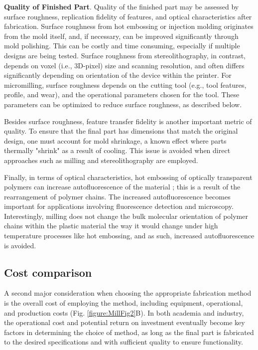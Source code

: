 \textbf{Quality of Finished Part}. Quality of the finished part may be assessed by surface roughness, replication fidelity of features, and optical characteristics after fabrication. Surface roughness from hot embossing or injection molding originates from the mold itself, and, if necessary, can be improved significantly through mold polishing. This can be costly and time consuming, especially if multiple designs are being tested. Surface roughness from stereolithography, in contrast, depends on voxel (i.e., 3D-pixel) size and scanning resolution, and often differs significantly depending on orientation of the device within the printer. For micromilling, surface roughness depends on the cutting tool (e.g., tool features, profile, and wear), and the operational parameters chosen for the tool. These parameters can be optimized to reduce surface roughness, as described below.

Besides surface roughness, feature transfer fidelity is another important metric of quality. To ensure that the final part has dimensions that match the original design, one must account for mold shrinkage, a known effect where parts thermally "shrink" as a result of cooling. This issue is avoided when direct approaches such as milling and stereolithography are employed.

Finally, in terms of optical characteristics, hot embossing of optically transparent polymers can increase autofluorescence of the material \cite{Young2012}; this is a result of the rearrangement of polymer chains. The increased autofluorescence becomes important for applications involving fluorescence detection and microscopy. Interestingly, milling does not change the bulk molecular orientation of polymer chains within the plastic material the way it would change under high temperature processes like hot embossing, and as such, increased autofluorescence is avoided.

\subsection{Cost comparison}
A second major consideration when choosing the appropriate fabrication method is the overall cost of employing the method, including equipment, operational, and production costs (Fig. \ref{figure:MillFig2}B). In both academia and industry, the operational cost and potential return on investment eventually become key factors in determining the choice of method, as long as the final part is fabricated to the desired specifications and with sufficient quality to ensure functionality.

